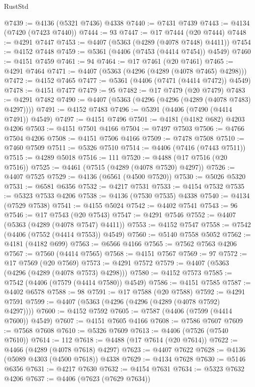 \begin{lexlean}{RustStd}
\begin{coremodule}
@7439 := @4136 (@5321 @7436) @4338
@7440 := @7431 @7439
@7443 := @4134 (@7420 (@7423 @7440))
@7444 := 93
@7447 := @17 @7444 (@20 @7444)
@7448 := @4291 @7447
@7453 := @4407 (@5363 (@4289 (@4078 @7448) @4411))
@7454 := @4152 @7448
@7459 := @5361 (@4406 (@7453 (@4414 @7454)) @4549)
@7460 := @4151 @7459
@7461 := 94
@7464 := @17 @7461 (@20 @7461)
@7465 := @4291 @7464
@7471 := @4407 (@5363 (@4296 (@4289 (@4078 @7465) @4298)))
@7472 := @4152 @7465
@7477 := @5361 (@4406 (@7471 (@4414 @7472)) @4549)
@7478 := @4151 @7477
@7479 := 95
@7482 := @17 @7479 (@20 @7479)
@7483 := @4291 @7482
@7490 := @4407 (@5363 (@4296 (@4296 (@4289 (@4078 @7483) @4297))))
@7491 := @4152 @7483
@7496 := @5391 (@4406 (@7490 (@4414 @7491)) @4549)
@7497 := @4151 @7496
@7501 := @4181 (@4182 @682) @4203 @4206
@7503 := @4151 @7501 @4166
@7504 := @7497 @7503
@7506 := @4766 @7504 @4206
@7508 := @4151 @7506 @4166
@7509 := @7478 @7508
@7510 := @7460 @7509
@7511 := @5326 @7510
@7514 := @4406 (@7416 (@7443 @7511))
@7515 := @4289 @5018
@7516 := 111
@7520 := @4488 (@17 @7516 (@20 @7516))
@7525 := @4461 (@7515 (@4289 (@4078 @7520) @4297))
@7526 := @4407 @7525
@7529 := @4136 (@6561 (@4500 @7520))
@7530 := @5026 @5320
@7531 := @6581 @6356
@7532 := @4217 @7531
@7533 := @4154 @7532
@7535 := @5323 @7533 @4206
@7538 := @4136 (@7530 @7535) @4338
@7540 := @4134 (@7529 @7538)
@7541 := @4155 @5024
@7542 := @4402 @7541
@7543 := 96
@7546 := @17 @7543 (@20 @7543)
@7547 := @4291 @7546
@7552 := @4407 (@5363 (@4289 (@4078 @7547) @4411))
@7553 := @4152 @7547
@7558 := @7542 (@4406 (@7552 (@4414 @7553)) @4549)
@7560 := @5140 @7558 @5052
@7562 := @4181 (@4182 @699)
@7563 := @6566 @4166
@7565 := @7562 @7563 @4206
@7567 := @7560 (@4414 @7565)
@7568 := @4151 @7567
@7569 := 97
@7572 := @17 @7569 (@20 @7569)
@7573 := @4291 @7572
@7579 := @4407 (@5363 (@4296 (@4289 (@4078 @7573) @4298)))
@7580 := @4152 @7573
@7585 := @7542 (@4406 (@7579 (@4414 @7580)) @4549)
@7586 := @4151 @7585
@7587 := @4402 @6578
@7588 := 98
@7591 := @17 @7588 (@20 @7588)
@7592 := @4291 @7591
@7599 := @4407 (@5363 (@4296 (@4296 (@4289 (@4078 @7592) @4297))))
@7600 := @4152 @7592
@7605 := @7587 (@4406 (@7599 (@4414 @7600)) @4549)
@7607 := @4151 @7605 @4166
@7608 := @7586 @7607
@7609 := @7568 @7608
@7610 := @5326 @7609
@7613 := @4406 (@7526 (@7540 @7610))
@7614 := 112
@7618 := @4488 (@17 @7614 (@20 @7614))
@7622 := @4466 (@4289 (@4078 @7618) @4297)
@7623 := @4407 @7622
@7628 := @4136 (@5089 @4303 (@4500 @7618)) @4338
@7629 := @4134 @7628
@7630 := @5146 @6356
@7631 := @4217 @7630
@7632 := @4154 @7631
@7634 := @5323 @7632 @4206
@7637 := @4406 (@7623 (@7629 @7634))

\end{coremodule}
\end{lexlean}
